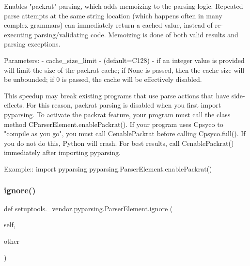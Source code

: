 \begin{DoxyVerb}Enables "packrat" parsing, which adds memoizing to the parsing logic.
   Repeated parse attempts at the same string location (which happens
   often in many complex grammars) can immediately return a cached value,
   instead of re-executing parsing/validating code.  Memoizing is done of
   both valid results and parsing exceptions.
   
   Parameters:
    - cache_size_limit - (default=C{128}) - if an integer value is provided
      will limit the size of the packrat cache; if None is passed, then
      the cache size will be unbounded; if 0 is passed, the cache will
      be effectively disabled.
    
   This speedup may break existing programs that use parse actions that
   have side-effects.  For this reason, packrat parsing is disabled when
   you first import pyparsing.  To activate the packrat feature, your
   program must call the class method C{ParserElement.enablePackrat()}.  If
   your program uses C{psyco} to "compile as you go", you must call
   C{enablePackrat} before calling C{psyco.full()}.  If you do not do this,
   Python will crash.  For best results, call C{enablePackrat()} immediately
   after importing pyparsing.
   
   Example::
       import pyparsing
       pyparsing.ParserElement.enablePackrat()
\end{DoxyVerb}
 \mbox{\label{classsetuptools_1_1__vendor_1_1pyparsing_1_1_parser_element_a8312fa721c50e624c6aaeb5b414f6f8b}} 
\subsubsection{\texorpdfstring{ignore()}{ignore()}}
{\footnotesize\ttfamily def setuptools.\+\_\+vendor.\+pyparsing.\+Parser\+Element.\+ignore (\begin{DoxyParamCaption}\item[{}]{self,  }\item[{}]{other }\end{DoxyParamCaption})}

